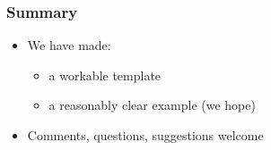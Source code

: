 \documentclass{beamer}
\begin{document}
\begin{frame}

\frametitle{Summary}

\begin{itemize}

	\item We have made:

	\begin{itemize}

		\item a workable template

		\item a reasonably clear example (we hope)

	\end{itemize}

	\item Comments, questions, suggestions welcome

\end{itemize}

\end{frame}


\end{document}
